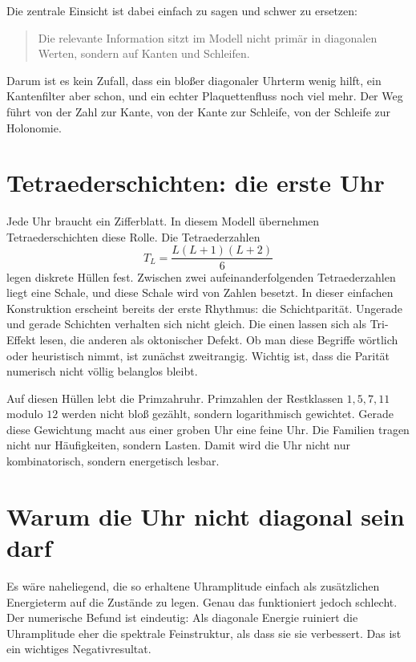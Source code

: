 \documentclass[11pt,a4paper]{article}
\theoremstyle{remark}
\begin{document}
	Die zentrale Einsicht ist dabei einfach zu sagen und schwer zu ersetzen:
	\begin{quote}
		Die relevante Information sitzt im Modell nicht primär in diagonalen Werten, sondern auf Kanten und Schleifen.
	\end{quote}
	
	Darum ist es kein Zufall, dass ein bloßer diagonaler Uhrterm wenig hilft, ein Kantenfilter aber schon, und ein echter Plaquettenfluss noch viel mehr. Der Weg führt von der Zahl zur Kante, von der Kante zur Schleife, von der Schleife zur Holonomie.
	
	\section{Tetraederschichten: die erste Uhr}
	
	Jede Uhr braucht ein Zifferblatt. In diesem Modell übernehmen Tetraederschichten diese Rolle. Die Tetraederzahlen
	\begin{equation}
		T_L=\frac{L(L+1)(L+2)}{6}
	\end{equation}
	legen diskrete Hüllen fest. Zwischen zwei aufeinanderfolgenden Tetraederzahlen liegt eine Schale, und diese Schale wird von Zahlen besetzt. In dieser einfachen Konstruktion erscheint bereits der erste Rhythmus: die Schichtparität. Ungerade und gerade Schichten verhalten sich nicht gleich. Die einen lassen sich als Tri-Effekt lesen, die anderen als oktonischer Defekt. Ob man diese Begriffe wörtlich oder heuristisch nimmt, ist zunächst zweitrangig. Wichtig ist, dass die Parität numerisch nicht völlig belanglos bleibt.
	
	Auf diesen Hüllen lebt die Primzahruhr. Primzahlen der Restklassen $1,5,7,11$ modulo $12$ werden nicht bloß gezählt, sondern logarithmisch gewichtet. Gerade diese Gewichtung macht aus einer groben Uhr eine feine Uhr. Die Familien tragen nicht nur Häufigkeiten, sondern Lasten. Damit wird die Uhr nicht nur kombinatorisch, sondern energetisch lesbar.
	
	\section{Warum die Uhr nicht diagonal sein darf}
	
	Es wäre naheliegend, die so erhaltene Uhramplitude einfach als zusätzlichen Energieterm auf die Zustände zu legen. Genau das funktioniert jedoch schlecht. Der numerische Befund ist eindeutig: Als diagonale Energie ruiniert die Uhramplitude eher die spektrale Feinstruktur, als dass sie sie verbessert. Das ist ein wichtiges Negativresultat.
	
\end{document}
